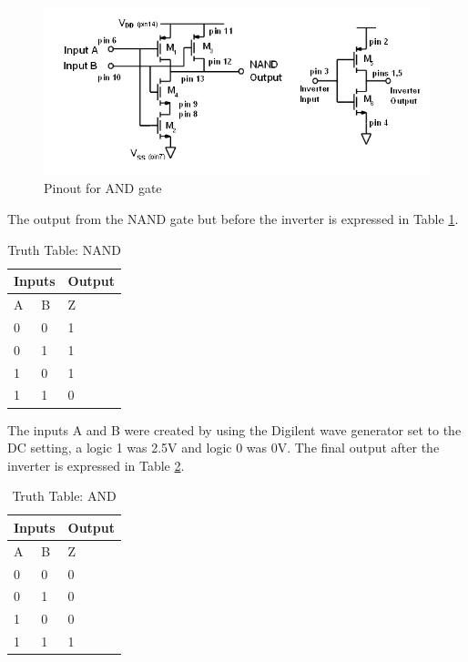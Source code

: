 \begin{figure}[H]
    \centering
    \includegraphics[width=.6\textwidth]{ExperimentalImplementation/NAND_pinout.png}
    \caption{Pinout for AND gate}
    \label{fig:NANDpin}
\end{figure}

The output from the NAND gate but before the inverter is expressed in Table \ref{tab:truthNAND}.

\begin{table}[H]
\centering
\caption{Truth Table: NAND}
\label{tab:truthNAND}
\begin{tabular}{|l|l|l|}
\hline
\multicolumn{2}{|l|}{Inputs} & Output \\ \hline
A             & B            & Z      \\ \hline
0             & 0            & 1      \\ \hline
0             & 1            & 1      \\ \hline
1             & 0            & 1      \\ \hline
1             & 1            & 0      \\ \hline
\end{tabular}
\end{table}

The inputs A and B were created by using the Digilent wave generator set to the DC setting, a logic 1 was 2.5V and logic 0 was 0V. The final output after the inverter is expressed in Table \ref{tab:truthAND}.

\begin{table}[H]
\centering
\caption{Truth Table: AND}
\label{tab:truthAND}
\begin{tabular}{|l|l|l|}
\hline
\multicolumn{2}{|l|}{Inputs} & Output \\ \hline
A             & B            & Z      \\ \hline
0             & 0            & 0      \\ \hline
0             & 1            & 0      \\ \hline
1             & 0            & 0      \\ \hline
1             & 1            & 1      \\ \hline
\end{tabular}
\end{table}

